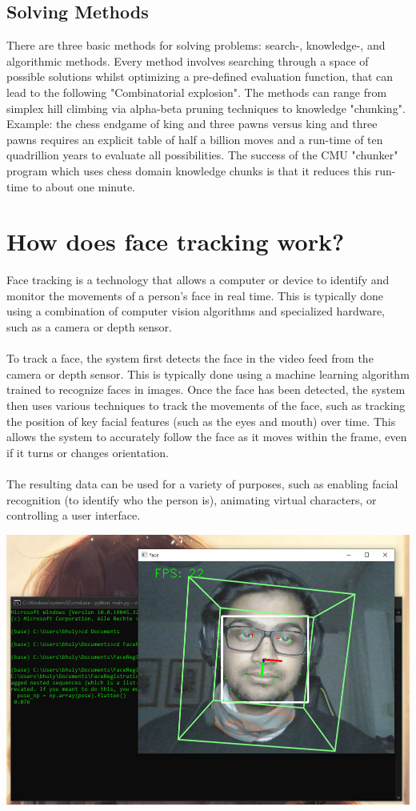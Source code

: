 \subsection{Solving Methods}
There are three basic methods for solving problems: search-, knowledge-, and algorithmic methods. Every method involves searching through a space of possible solutions whilst optimizing a pre-defined evaluation function, that can lead to the following "Combinatorial explosion". The methods can range from simplex hill climbing via alpha-beta pruning techniques to knowledge "chunking". 
Example: the chess endgame of king and three pawns versus king and three pawns requires an explicit table of half a billion moves and a run-time of ten quadrillion years to evaluate all possibilities. The success of the CMU "chunker" program which uses chess domain knowledge chunks is that it reduces this run-time to about one minute.

\section{How does face tracking work?}
Face tracking is a technology that allows a computer or device to identify and monitor the movements of a person's face in real time. This is typically done using a combination of computer vision algorithms and specialized hardware, such as a camera or depth sensor.
\\
\\
To track a face, the system first detects the face in the video feed from the camera or depth sensor. This is typically done using a machine learning algorithm trained to recognize faces in images. Once the face has been detected, the system then uses various techniques to track the movements of the face, such as tracking the position of key facial features (such as the eyes and mouth) over time. This allows the system to accurately follow the face as it moves within the frame, even if it turns or changes orientation.
\\
\\
The resulting data can be used for a variety of purposes, such as enabling facial recognition (to identify who the person is), animating virtual characters, or controlling a user interface.

\includegraphics[width=1\textwidth]{pics/bhuiyanfracetracking.png}

